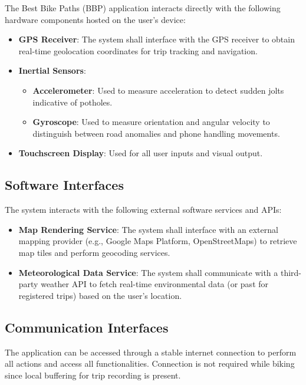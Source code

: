 The Best Bike Paths (BBP) application interacts directly with the following hardware components hosted on the user's device:

\begin{itemize}
    \item \textbf{GPS Receiver}: The system shall interface with the GPS receiver to obtain real-time geolocation coordinates for trip tracking and navigation.

    \item \textbf{Inertial Sensors}:
    \begin{itemize}
        \item \textbf{Accelerometer}: Used to measure acceleration to detect sudden jolts indicative of potholes.
        \item \textbf{Gyroscope}: Used to measure orientation and angular velocity to distinguish between road anomalies and phone handling movements.
    \end{itemize}

    \item \textbf{Touchscreen Display}: Used for all user inputs and visual output.
\end{itemize}

\subsection{Software Interfaces}

The system interacts with the following external software services and APIs:

\begin{itemize}
    \item \textbf{Map Rendering Service}: The system shall interface with an external mapping provider (e.g., Google Maps Platform, OpenStreetMaps) to retrieve map tiles and perform geocoding services.

    \item \textbf{Meteorological Data Service}: The system shall communicate with a third-party weather API to fetch real-time environmental data (or past for registered trips) based on the user's location.
\end{itemize}

\subsection{Communication Interfaces}

The application can be accessed through a stable internet connection to perform all actions and access all functionalities. Connection is not required while biking since local buffering for trip recording is present.


